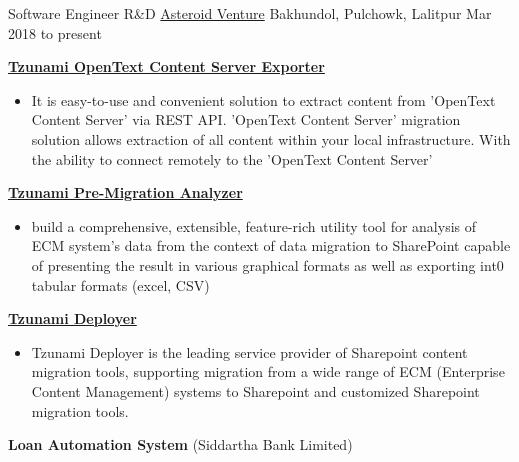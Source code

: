 

\begin{cventries}
\cventry
{Software Engineer R\&D} %
{\href{https://asteroidventure.com/}{Asteroid Venture}} %
{Bakhundol, Pulchowk, Lalitpur} %
{Mar 2018 to present} %
{
	\begin{cvitems} %
		\item {\textbf{ \href{https://tzunami.com/opentext-content-server/}{Tzunami OpenText Content Server Exporter}}}
		\begin{itemize}
			\item {It is easy-to-use and convenient solution to extract content from 'OpenText Content Server' via REST API. 'OpenText Content Server' migration solution allows extraction of all content within your local infrastructure. With the ability to connect remotely to the 'OpenText Content Server'}
		\end{itemize}
		\item {\textbf{ \href{https://tzunami.com/pre-migration-analysis/}{Tzunami Pre-Migration Analyzer}}}
		\begin{itemize}
			\item {build a comprehensive, extensible, feature-rich utility tool for analysis of ECM system's data from the context of data migration to SharePoint capable of presenting the result in various graphical formats as well as exporting int0 tabular formats (excel, CSV)}
		\end{itemize}
		\item {\textbf{\href{https://tzunami.com/}{Tzunami Deployer}}
		\begin{itemize}
			\item {Tzunami Deployer is the leading service provider of Sharepoint content migration tools, supporting migration from a wide range of ECM (Enterprise Content Management) systems to Sharepoint and customized Sharepoint migration tools.}
		\end{itemize}
		\item {\textbf{Loan Automation System} (Siddartha Bank Limited)}
}
\end{cvitems}}
\end{cventries}
